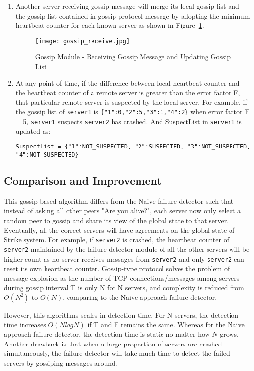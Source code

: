 \documentclass[dareport.tex]{subfiles}
\begin{document}
\begin{enumerate}[leftmargin=*]
\item Another server receiving gossip message will merge its local gossip list and the gossip list contained in gossip protocol message by adopting the minimum heartbeat counter for each known server as shown in Figure~\ref{fig:receiving_gmsg}.

\begin{figure}[h]
\texttt{[image: gossip\_receive.jpg]}
\centering
\caption{Gossip Module - Receiving Gossip Message and Updating Gossip List}
\label{fig:receiving_gmsg}
\centering
\end{figure}

\item At any point of time, if the difference between local heartbeat counter and the heartbeat counter of a remote server is greater than the error factor F, that particular remote server is suspected by the local server. For example, if the gossip list of \verb|server1| is \verb|{"1":0,"2":5,"3":1,"4":2}| when error factor F = 5, \verb|server1| suspects \verb|server2| has crashed. And SuspectList in \verb|server1| is updated as:

\verb|SuspectList = {"1":NOT_SUSPECTED, "2":SUSPECTED, "3":NOT_SUSPECTED, "4":NOT_SUSPECTED}|

\end{enumerate}

\subsection{Comparison and Improvement}

This gossip based algorithm differs from the Naive failure detector such that instead of asking all other peers "Are you alive?", each server now only select a random peer to gossip and share its view of the global state to that server. Eventually, all the correct servers will have agreements on the global state of Strike system. For example, if \verb|server2| is crashed, the heartbeat counter of \verb|server2| maintained by the failure detector module of all the other servers will be higher count as no server receives messages from \verb|server2| and only \verb|server2| can reset its own heartbeat counter. Gossip-type protocol solves the problem of message explosion as the number of TCP connections/messages among servers during gossip interval T is only N for N servers, and complexity is reduced from $O({N^2})$ to $O(N)$, comparing to the Naive approach failure detector.

However, this algorithms scales in detection time. For N servers, the detection time increases $O(NlogN)$\cite{gossip} if T and F remains the same. Whereas for the Naive approach failure detector, the detection time is static no matter how $N$ grows. Another drawback is that when a large proportion of servers are crashed simultaneously, the failure detector will take much time to detect the failed servers by gossiping messages around.
\end{document}

